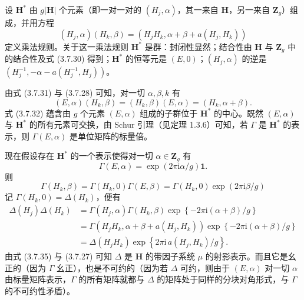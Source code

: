 设 $\mathbf{H}^{*}$ 由 $g|\mathbf{H}|$ 个元素（即一对一对的 $(H_{j}, \alpha)$，其一来自 $\mathbf{H}$，另一来自 $\mathbf{Z}_{g}$）组成，并用方程
\begin{equation*}
(H_{j}, \alpha)(H_{k}, \beta) = (H_{j}H_{k}, \alpha + \beta + a(H_{j}, H_{k}))
\tag{3.7.31}
\end{equation*}
定义乘法规则。关于这一乘法规则 $\mathbf{H}^{*}$ 是群：封闭性显然；结合性由 $\mathbf{H}$ 与 $\mathbf{Z}_{g}$ 中的结合性及式 (3.7.30) 得到；$\mathbf{H}^{*}$ 的恒等元是 $(E, 0)$；$(H_{j}, \alpha)$ 的逆是 $(H^{-1}_{j}, -\alpha - a(H^{-1}_{j}, H_{j}))$。

由式 (3.7.31) 与 (3.7.28) 可知，对一切 $\alpha, \beta, k$ 有
\begin{equation*}
(E, \alpha)(H_{k}, \beta) = (H_{k}, \beta)(E, \alpha) = (H_{k}, \alpha + \beta).
\tag{3.7.32}
\end{equation*}
式 (3.7.32) 蕴含由 $g$ 个元素 $(E, \alpha)$ 组成的子群位于 $\mathbf{H}^{*}$ 的中心。既然 $(E, \alpha)$ 与 $\mathbf{H}^{*}$ 的所有元素可交换，由 Schur 引理（见定理 1.3.6）可知，若 $\Gamma$ 是 $\mathbf{H}^{*}$ 的表示，则 $\Gamma(E, \alpha)$ 是单位矩阵的标量倍。

现在假设存在 $\mathbf{H}^{*}$ 的一个表示使得对一切 $\alpha \in \mathbf{Z}_{g}$ 有
\begin{equation*}
\Gamma(E, \alpha) = \exp(2\pi\mathrm{i}\alpha/g)\mathbf{1}.
\tag{3.7.33}
\end{equation*}
则
\begin{equation*}
\Gamma(H_{k}, \beta) = \Gamma(H_{k}, 0)\Gamma(E, \beta) = \Gamma(H_{k}, 0)\exp(2\pi\mathrm{i}\beta/g)
\tag{3.7.34}
\end{equation*}
记 $\Gamma(H_{k}, 0) = \Delta(H_{k})$，便有
\begin{equation*}
\begin{aligned}
\Delta(H_{j})\Delta(H_{k}) &= \Gamma(H_{j}, \alpha)\Gamma(H_{k}, \beta)\exp\left\{-2\pi\mathrm{i}(\alpha + \beta)/g\right\}\\
&= \Gamma(H_{j}H_{k}, \alpha + \beta + a(H_{j}, H_{k}))\exp\left\{-2\pi\mathrm{i}(\alpha + \beta)/g\right\}\\
&= \Delta(H_{j}H_{k})\exp\left\{2\pi\mathrm{i}\,a(H_{j}, H_{k})/g\right\}.
\end{aligned}
\tag{3.7.35}
\end{equation*}
由式 (3.7.35) 与 (3.7.27) 可知 $\Delta$ 是 $\mathbf{H}$ 的带因子系统 $\mu$ 的射影表示。而且它是幺正的（因为 $\Gamma$ 幺正），也是不可约的（因为若 $\Delta$ 可约，则由于 $(E, \alpha)$ 对一切 $\alpha$ 由标量矩阵表示，$\Gamma$ 的所有矩阵就都与 $\Delta$ 的矩阵处于同样的分块对角形式，与 $\Gamma$ 的不可约性矛盾）。

